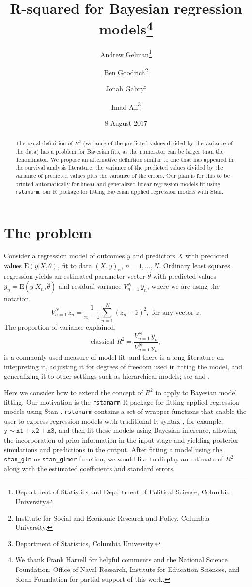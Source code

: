 \documentclass[11pt]{article}
\title{\bf R-squared for Bayesian regression models\footnote{
  We thank Frank Harrell for helpful comments and the National Science Foundation,
  Office of Naval Research, Institute for Education Sciences, and Sloan Foundation
  for partial support of this work.
}\vspace{.1in}}
\author{Andrew Gelman\footnote{Department of Statistics and Department of Political Science, Columbia University.}
  \and Ben Goodrich\footnote{Institute for Social and Economic Research and Policy, Columbia University.}
  \and Jonah Gabry$^\ddagger$
  \and Imad Ali\footnote{Department of Statistics, Columbia University.
}\vspace{.1in}}
\date{8 August 2017\vspace{-.1in}}
\begin{document}
\sloppy
\maketitle
\thispagestyle{empty}

\begin{abstract}
The usual definition of $R^2$ (variance of the predicted values divided by the
variance of the data) has a problem for Bayesian fits, as the numerator can be
larger than the denominator.  We propose an alternative definition similar to
one that has appeared in the survival analysis literature:  the variance of the
predicted values divided by the variance of predicted values plus the variance 
of the errors. Our plan is for this to be printed automatically for linear and
generalized linear regression models fit using {\tt rstanarm}, our R package
for fitting Bayesian applied regression models with Stan.
\end{abstract}

\section{The problem}

Consider a regression model of outcomes $y$ and predictors $X$ with predicted
values $\mbox{E}(y|X,\theta)$, fit to data $(X,y)_n, \, n=1,\ldots,N$.  Ordinary
least squares regression yields an estimated parameter vector $\hat{\theta}$
with predicted values $\hat{y}_n = \mbox{E}(y | X_n, \hat{\theta})$ and residual
variance $V_{n=1}^N \,\hat{y}_n$, where we are using the notation,
%
$$
V_{n=1}^N \, z_n = \frac{1}{n-1}\sum_{n=1}^N (z_n - \bar{z})^2, \mbox{ for any vector }z.
$$
%
The proportion of variance explained,
%
\begin{equation}\label{rsq1}
\mbox{classical } R^2 = \frac{V_{n=1}^N \,\hat{y}_n}{V_{n=1}^N \,y_n},
\end{equation}
%
is a commonly used measure of model fit, and there is a long literature on
interpreting it, adjusting it for degrees of freedom used in fitting the model,
and generalizing it to other settings such as hierarchical models; see \cite{Xu2003}
and \cite{GelmanPardoe2006}.

Here we consider how to extend the concept of $R^2$ to apply to Bayesian model
fitting.  Our motivation is the {\tt rstanarm} R package
\citep{rstanarmRpackage} for fitting applied regression models using Stan
\citep{stan}. {\tt rstanarm} contains a set of wrapper functions that enable the
user to express regression models with traditional R syntax \citep{rcore}, 
for example, $\mathtt{y \sim x1 + x2 + x3}$, and then fit these models using 
Bayesian inference, allowing the incorporation
of prior information in the input stage and yielding posterior simulations and
predictions in the output.  After fitting a model using the \verb#stan_glm#
or \verb#stan_glmer# function, we would like to display an estimate of $R^2$
along with the estimated coefficients and standard errors.
\end{document}
